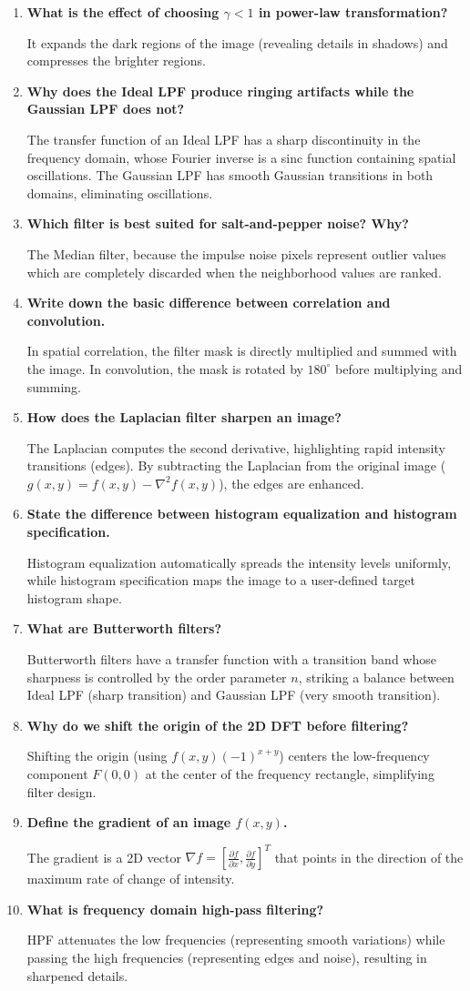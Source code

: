 \documentclass[12pt,a4paper]{article}
\newcommand{\Q}[1]{\textbf{#1}\par\noindent\ignorespaces}
\begin{document}
\begin{tcolorbox}[exambox, title={\textbf{Frequently Asked / Viva Questions}}]
\begin{enumerate}[leftmargin=*, itemsep=3.5pt, label=\arabic*.]
  \item \Q{What is the effect of choosing $\gamma < 1$ in power-law transformation?} It expands the dark regions of the image (revealing details in shadows) and compresses the brighter regions.
  \item \Q{Why does the Ideal LPF produce ringing artifacts while the Gaussian LPF does not?} The transfer function of an Ideal LPF has a sharp discontinuity in the frequency domain, whose Fourier inverse is a sinc function containing spatial oscillations. The Gaussian LPF has smooth Gaussian transitions in both domains, eliminating oscillations.
  \item \Q{Which filter is best suited for salt-and-pepper noise? Why?} The Median filter, because the impulse noise pixels represent outlier values which are completely discarded when the neighborhood values are ranked.
  \item \Q{Write down the basic difference between correlation and convolution.} In spatial correlation, the filter mask is directly multiplied and summed with the image. In convolution, the mask is rotated by $180^\circ$ before multiplying and summing.
  \item \Q{How does the Laplacian filter sharpen an image?} The Laplacian computes the second derivative, highlighting rapid intensity transitions (edges). By subtracting the Laplacian from the original image ($g(x,y) = f(x,y) - \nabla^2 f(x,y)$), the edges are enhanced.
  \item \Q{State the difference between histogram equalization and histogram specification.} Histogram equalization automatically spreads the intensity levels uniformly, while histogram specification maps the image to a user-defined target histogram shape.
  \item \Q{What are Butterworth filters?} Butterworth filters have a transfer function with a transition band whose sharpness is controlled by the order parameter $n$, striking a balance between Ideal LPF (sharp transition) and Gaussian LPF (very smooth transition).
  \item \Q{Why do we shift the origin of the 2D DFT before filtering?} Shifting the origin (using $f(x,y)(-1)^{x+y}$) centers the low-frequency component $F(0,0)$ at the center of the frequency rectangle, simplifying filter design.
  \item \Q{Define the gradient of an image $f(x,y)$.} The gradient is a 2D vector $\nabla f = \left[ \frac{\partial f}{\partial x}, \frac{\partial f}{\partial y} \right]^T$ that points in the direction of the maximum rate of change of intensity.
  \item \Q{What is frequency domain high-pass filtering?} HPF attenuates the low frequencies (representing smooth variations) while passing the high frequencies (representing edges and noise), resulting in sharpened details.
\end{enumerate}
\end{tcolorbox}
\end{document}
